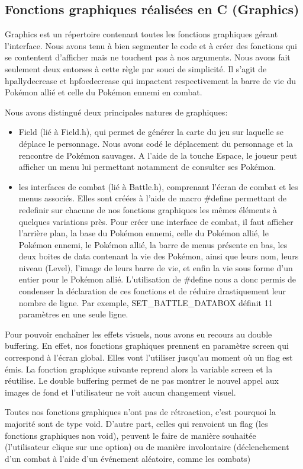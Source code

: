 \subsection{Fonctions graphiques réalisées en C (Graphics)}

Graphics est un répertoire contenant toutes les fonctions graphiques gérant l'interface. Nous avons tenu à bien segmenter le code et à créer des fonctions qui se contentent d'afficher mais ne touchent pas à nos arguments. Nous avons fait seulement deux entorses à cette règle par souci de simplicité. Il s'agit de 
 hpallydecrease et hpfoedecrease qui impactent respectivement la barre de vie du Pokémon allié et celle du Pokémon ennemi en combat.
 
Nous avons distingué deux principales natures de graphiques:

\begin{itemize}
\item Field (lié à Field.h), qui permet de générer la carte du jeu sur laquelle se déplace le personnage. Nous avons codé le déplacement du personnage et la rencontre de Pokémon sauvages. A l'aide de la touche Espace, le joueur peut afficher un menu lui permettant notamment de consulter ses Pokémon.
\item les interfaces de combat (lié à Battle.h), comprenant l'écran de combat et les menus associés. Elles sont créées à l'aide de macro \#define permettant de redefinir sur chacune de nos fonctions graphiques les mêmes éléments à quelques variations près. Pour créer une interface de combat, il faut afficher l'arrière plan, la base du Pokémon ennemi, celle du Pokémon allié, le Pokémon ennemi, le Pokémon allié, la barre de menus présente en bas, les deux boites de data contenant la vie des Pokémon, ainsi que leurs nom, leurs niveau (Level), l'image de leurs barre de vie, et enfin la vie sous forme d'un entier pour le Pokémon allié. L'utilisation de \#define nous a donc permis de condenser la déclaration de ces fonctions et de réduire drastiquement leur nombre de ligne. Par exemple, SET\_BATTLE\_DATABOX définit 11 paramètres en une seule ligne.  
\end{itemize}

Pour pouvoir enchaîner les effets visuels, nous avons eu recours au double buffering. En effet, nos fonctions graphiques prennent en paramètre screen qui correspond à l'écran global. Elles vont l'utiliser jusqu'au moment où un flag est émis. La fonction graphique suivante reprend alors la variable screen et la réutilise. Le double buffering permet de ne pas montrer le nouvel appel aux images de fond et l'utilisateur ne voit aucun changement visuel.

Toutes nos fonctions graphiques n'ont pas de rétroaction, c'est pourquoi la majorité sont de type void. D'autre part, celles qui renvoient un flag (les fonctions graphiques non void), peuvent le faire de manière souhaitée (l'utilisateur clique sur une option) ou de manière involontaire (déclenchement d'un combat à l'aide d'un événement aléatoire, comme les combats)
